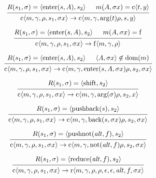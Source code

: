 \documentclass[12pt]{article}
\begin{document}
\pagestyle{empty}

\[
  \begin{prooftree}
    \hypo{R(s_1, \sigma) = \langle\mathrm{enter}(s, A), s_2\rangle}
    \hypo{m(A, \sigma x) = \mathrm{c}\langle t, y\rangle}
    \infer2{\mathrm{c}\langle m, \gamma, \rho, s_1, \sigma x\rangle \to \mathrm{c}\langle m, \gamma, \mathrm{arg}(t) \rho, s, y\rangle}
  \end{prooftree}
\]

\[
  \begin{prooftree}
    \hypo{R(s_1, \sigma) = \langle\mathrm{enter}(s, A), s_2\rangle}
    \hypo{m(A, \sigma x) = \mathrm{f}}
    \infer2{\mathrm{c}\langle m, \gamma, \rho, s_1, \sigma x\rangle \to \mathrm{f}\langle m, \gamma, \rho\rangle}
  \end{prooftree}
\]

\[
  \begin{prooftree}
    \hypo{R(s_1, \sigma) = \langle\mathrm{enter}(s, A), s_2\rangle}
    \hypo{\langle A, \sigma x\rangle \not\in \mathrm{dom}(m)}
    \infer2{\mathrm{c}\langle m, \gamma, \rho, s_1, \sigma x\rangle \to \mathrm{c}\langle m, \gamma, \mathrm{enter}(s, A, \sigma x) \rho, s_2, \sigma x\rangle}
  \end{prooftree}
\]

\[
  \begin{prooftree}
    \hypo{R(s_1, \sigma) = \langle\mathrm{shift}, s_2\rangle}
    \infer1{\mathrm{c}\langle m, \gamma, \rho, s_1, \sigma x\rangle \to \mathrm{c}\langle m, \gamma, \mathrm{arg}(\sigma) \rho, s_2, x\rangle}
  \end{prooftree}
\]

\[
  \begin{prooftree}
    \hypo{R(s_1, \sigma) = \langle\mathrm{pushback}(s), s_2\rangle}
    \infer1{\mathrm{c}\langle m, \gamma, \rho, s_1, \sigma x\rangle \to \mathrm{c}\langle m, \gamma, \mathrm{back}(s, \sigma x) \rho, s_2, \sigma x\rangle}
  \end{prooftree}
\]

\[
  \begin{prooftree}
    \hypo{R(s_1, \sigma) = \langle\mathrm{pushnot}(\mathit{alt}, f), s_2\rangle}
    \infer1{\mathrm{c}\langle m, \gamma, \rho, s_1, \sigma x\rangle \to \mathrm{c}\langle m, \gamma, \mathrm{not}(\mathit{alt}, f) \rho, s_2, \sigma x\rangle}
  \end{prooftree}
\]

\[
  \begin{prooftree}
    \hypo{R(s_1, \sigma) = \langle\mathrm{reduce}(\mathit{alt}, f), s_2\rangle}
    \infer1{\mathrm{c}\langle m, \gamma, \rho, s_1, \sigma x\rangle \to \mathrm{r}\langle m, \gamma, \rho, \rho, \epsilon, \epsilon, \mathit{alt}, f, \sigma x\rangle}
  \end{prooftree}
\]
\end{document}
